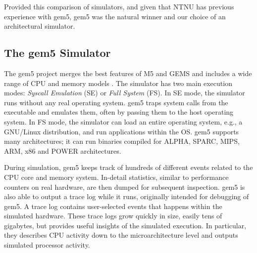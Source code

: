 Provided this comparison of simulators, and given that NTNU has previous
experience with gem5, gem5 was the natural winner and our choice of an
architectural simulator.


\subsection{The gem5 Simulator}

The gem5 project \cite{gem5} merges the best features of M5 \cite{binkert2006m5}
and GEMS \cite{GEMS} and includes a wide range of CPU and memory models
\cite{gem5hipeac}. The simulator has two main execution modes: \textit{Syscall
Emulation} (SE) or \textit{Full System} (FS). In SE mode, the simulator runs
without any real operating system. gem5 traps system calls from the executable
and emulates them, often by passing them to the host operating system. In FS
mode, the simulator can load an entire operating system, e.g., a GNU/Linux
distribution, and run applications within the OS. gem5 supports many
architectures; it can run binaries compiled for ALPHA, SPARC, MIPS, ARM, x86 and
POWER architectures.

During simulation, gem5 keeps track of hundreds of different events related to
the CPU core and memory system. In-detail statistics, similar to performance
counters on real hardware, are then dumped for subsequent inspection. gem5 is
also able to output a trace log while it runs, originally intended for debugging
of gem5. A trace log contains user-selected events that happens within the
simulated hardware. These trace logs grow quickly in size, easily tens of
gigabytes, but provides useful insights of the simulated execution. In
particular, they describes CPU activity down to the microarchitecture level and
outputs simulated processor activity.

